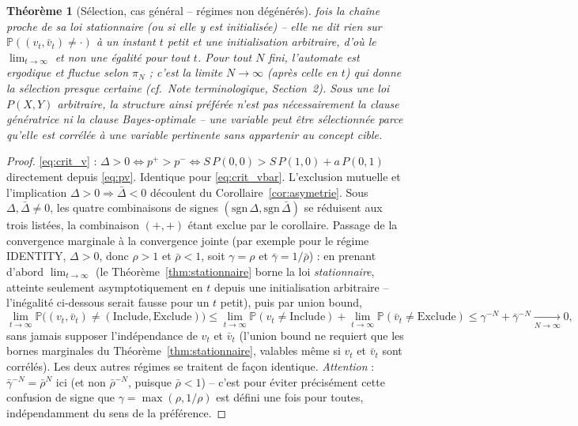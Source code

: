 \documentclass[12pt,a4paper]{article}
\newtheorem{theorem}{Théorème}[section]
\theoremstyle{remark}
\newcommand{\Inc}{\ensuremath{\mathrm{Include}}}
\newcommand{\Exc}{\ensuremath{\mathrm{Exclude}}}
\newcommand{\vbar}{\bar{v}}
\begin{document}
\begin{theorem}[Sélection, cas général -- régimes non dégénérés]
fois la chaîne proche de sa loi stationnaire (ou si elle y est initialisée) --
elle ne dit rien sur $\mathbb P((v_t,\vbar_t)\ne\cdot)$ à un instant $t$ petit
et une initialisation arbitraire, d'où le $\lim_{t\to\infty}$ et non une
égalité pour tout $t$. Pour tout $N$ fini, l'automate est ergodique et fluctue
selon $\pi_N$ ; c'est la limite $N\to\infty$ (après celle en $t$) qui donne la
sélection presque certaine (cf.\ Note terminologique, Section~2). Sous une loi
$P(X,Y)$ arbitraire, la structure ainsi préférée n'est pas nécessairement la
clause génératrice ni la clause Bayes-optimale -- une variable peut être
sélectionnée parce qu'elle est corrélée à une variable pertinente sans
appartenir au concept cible.
\end{theorem}

\begin{proof}
\eqref{eq:crit_v} : $\Delta>0 \iff p^+>p^- \iff S\,P(0,0) > S\,P(1,0)+a\,P(0,1)$
directement depuis \eqref{eq:pv}. Identique pour \eqref{eq:crit_vbar}.
L'exclusion mutuelle et l'implication $\Delta>0\Rightarrow\bar\Delta<0$
découlent du Corollaire~\ref{cor:asymetrie}. Sous $\Delta,\bar\Delta\ne0$, les
quatre combinaisons de signes $(\mathrm{sgn}\,\Delta,\mathrm{sgn}\,\bar\Delta)$
se réduisent aux trois listées, la combinaison $(+,+)$ étant exclue par le
corollaire. Passage de la convergence marginale à la convergence jointe (par
exemple pour le régime IDENTITY, $\Delta>0$, donc $\rho>1$ et $\bar\rho<1$,
soit $\gamma=\rho$ et $\bar\gamma=1/\bar\rho$) : en prenant d'abord
$\lim_{t\to\infty}$ (le Théorème~\ref{thm:stationnaire} borne la loi
\emph{stationnaire}, atteinte seulement asymptotiquement en $t$ depuis une
initialisation arbitraire -- l'inégalité ci-dessous serait fausse pour un $t$
petit), puis par union bound,
\[
  \lim_{t\to\infty}\mathbb P\bigl((v_t,\vbar_t)\ne(\Inc,\Exc)\bigr)
  \le \lim_{t\to\infty}\mathbb P(v_t\ne\Inc) + \lim_{t\to\infty}\mathbb P(\vbar_t\ne\Exc)
  \le \gamma^{-N} + \bar\gamma^{-N} \xrightarrow[N\to\infty]{} 0,
\]
sans jamais supposer l'indépendance de $v_t$ et $\vbar_t$ (l'union bound ne
requiert que les bornes marginales du Théorème~\ref{thm:stationnaire},
valables même si $v_t$ et $\vbar_t$ sont corrélés). Les deux autres régimes se traitent de
façon identique. \emph{Attention} : $\bar\gamma^{-N}=\bar\rho^{N}$ ici (et non
$\bar\rho^{-N}$, puisque $\bar\rho<1$) -- c'est pour éviter précisément cette
confusion de signe que $\gamma=\max(\rho,1/\rho)$ est défini une fois pour
toutes, indépendamment du sens de la préférence.
\end{proof}
\end{document}
